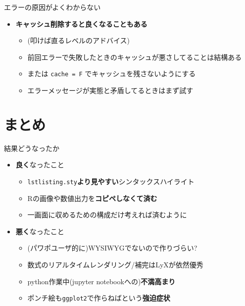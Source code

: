 \documentclass[
  14pt,
  ignorenonframetext,
]{beamer}
\providecommand{\tightlist}{%
  \setlength{\itemsep}{0pt}\setlength{\parskip}{0pt}}
\begin{document}
\begin{frame}[fragile]{エラーの原因がよくわからない}
\protect\hypertarget{ux30a8ux30e9ux30fcux306eux539fux56e0ux304cux3088ux304fux308fux304bux3089ux306aux3044}{}

\begin{itemize}
\tightlist
\item
  \textbf{キャッシュ削除すると良くなることもある}

  \begin{itemize}
  \tightlist
  \item
    (叩けば直るレベルのアドバイス)
  \item
    前回エラーで失敗したときのキャッシュが悪さしてることは結構ある
  \item
    または \texttt{cache\ =\ F} でキャッシュを残さないようにする
  \item
    エラーメッセージが実態と矛盾してるときはまず試す
  \end{itemize}
\end{itemize}

\end{frame}

\hypertarget{ux307eux3068ux3081}{%
\section{まとめ}\label{ux307eux3068ux3081}}

\begin{frame}[fragile]{結果どうなったか}
\protect\hypertarget{ux7d50ux679cux3069ux3046ux306aux3063ux305fux304b}{}

\begin{itemize}
\tightlist
\item
  \textbf{良く}なったこと

  \begin{itemize}
  \tightlist
  \item
    \texttt{lstlisting.sty}\textbf{より見やすい}シンタックスハイライト
  \item
    Rの画像や数値出力を\textbf{コピペしなくて済む}
  \item
    一画面に収めるための構成だけ考えれば済むように
  \end{itemize}
\item
  \textbf{悪く}なったこと

  \begin{itemize}
  \tightlist
  \item
    (パワポユーザ的に)WYSIWYGでないので作りづらい?
  \item
    数式のリアルタイムレンダリング/補完はLyXが依然優秀
  \item
    python作業中(jupyter notebookへの)\textbf{不満高まり}
  \item
    ポンチ絵も\texttt{ggplot2}で作らねばという\textbf{強迫症状}
  \end{itemize}
\end{itemize}

\end{frame}
\end{document}
